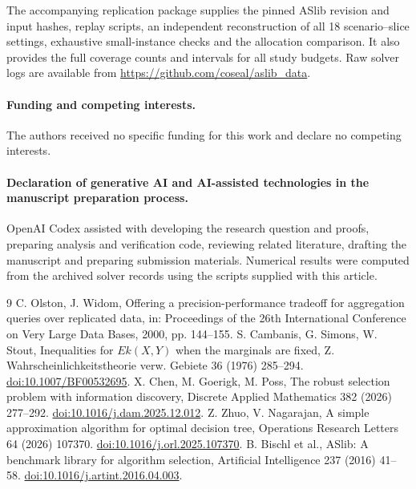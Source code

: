 \documentclass[final,5p,times,twocolumn]{elsarticle}
\begin{document}
The accompanying replication package supplies the pinned ASlib revision and input hashes, replay scripts, an independent reconstruction of all 18 scenario--slice settings, exhaustive small-instance checks and the allocation comparison. It also provides the full coverage counts and intervals for all study budgets. Raw solver logs are available from \url{https://github.com/coseal/aslib_data}.

\paragraph{Funding and competing interests.}
The authors received no specific funding for this work and declare no competing interests.

\paragraph{Declaration of generative AI and AI-assisted technologies in the manuscript preparation process.}
OpenAI Codex assisted with developing the research question and proofs, preparing analysis and verification code, reviewing related literature, drafting the manuscript and preparing submission materials. Numerical results were computed from the archived solver records using the scripts supplied with this article.

\begin{thebibliography}{9}
 C. Olston, J. Widom, Offering a precision-performance tradeoff for aggregation queries over replicated data, in: Proceedings of the 26th International Conference on Very Large Data Bases, 2000, pp. 144--155.
 S. Cambanis, G. Simons, W. Stout, Inequalities for $Ek(X,Y)$ when the marginals are fixed, Z. Wahrscheinlichkeitstheorie verw. Gebiete 36 (1976) 285--294. \href{https://doi.org/10.1007/BF00532695}{doi:10.1007/BF00532695}.
 X. Chen, M. Goerigk, M. Poss, The robust selection problem with information discovery, Discrete Applied Mathematics 382 (2026) 277--292. \href{https://doi.org/10.1016/j.dam.2025.12.012}{doi:10.1016/j.dam.2025.12.012}.
 Z. Zhuo, V. Nagarajan, A simple approximation algorithm for optimal decision tree, Operations Research Letters 64 (2026) 107370. \href{https://doi.org/10.1016/j.orl.2025.107370}{doi:10.1016/j.orl.2025.107370}.
 B. Bischl et al., ASlib: A benchmark library for algorithm selection, Artificial Intelligence 237 (2016) 41--58. \href{https://doi.org/10.1016/j.artint.2016.04.003}{doi:10.1016/j.artint.2016.04.003}.
\end{thebibliography}
\end{document}
